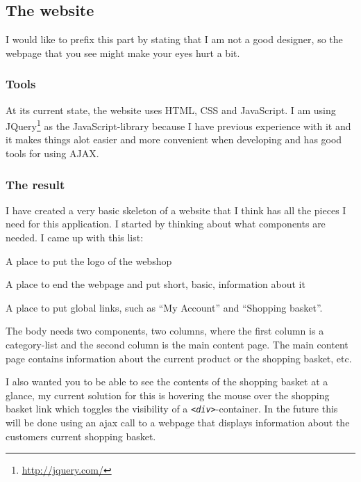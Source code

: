 \documentclass[12pt, a4paper,titlepage]{article}
\begin{document}
\subsection{The website}
I would like to prefix this part by stating that I am not a good designer,
so the webpage that you see might make your eyes hurt a bit.

\subsubsection{Tools}
At its current state, the website uses HTML, CSS and JavaScript. 
I am using JQuery\footnote{\url{http://jquery.com/}} as the JavaScript-library
because I have previous experience with it and it makes things alot easier and
more convenient when developing and has good tools for using AJAX.

\subsubsection{The result}

I have created a very basic skeleton of a website that I think has all the pieces
I need for this application. I started by thinking about what components are
needed. I came up with this list:
\begin{description}
\setlength\itemsep{-5pt}
\item[Header] A place to put the logo of the webshop
\item[Footer] A place to end the webpage and put short, basic, information
		about it
\item[Navigation] A place to put global links, such as ``My Account'' and ``Shopping basket''.
\item[Body] The body needs two components, two columns, where the first
	column is a category-list and the second column is the main content page.
	The main content page contains information about the current product
	or the shopping basket, etc.
\end{description}

I also wanted you to be able to see the contents of the shopping basket at a
glance, my current solution for this is hovering the mouse over the shopping
basket link which toggles the visibility of a \emph{\lstinline{<div>}}-container.
In the future this will be done using an ajax call to a webpage that displays
information about the customers current shopping basket.
\end{document}
